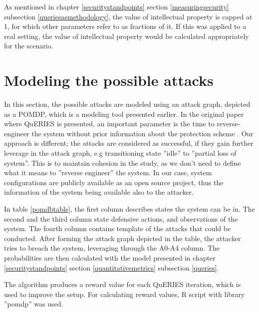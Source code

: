 As mentioned in chapter \ref{securitystandpoints} section
\ref{measuringsecurity} subsection \ref{queriesasmethodology}, the
value of intellectual property is capped at 1, for which other
parameters refer to as fractions of it. If this was applied to a real
setting, the value of intellectual property would be calculated
appropriately for the scenario.

\section{Modeling the possible attacks}

In this section, the possible attacks are modeled using an attack
graph, depicted as a POMDP, which is a modeling tool presented
earlier. In the original paper where QuERIES is presented, an
important parameter is the time to reverse-engineer the system without
prior information about the protection scheme
\cite{carin2008cybersecurity}. Our approach is different; the attacks
are considered as successful, if they gain further leverage in the
attack graph, e.g transitioning state ''idle'' to ''partial loss of
system''. This is to maintain cohesion in the study, as we don't need
to define what it means to ''reverse engineer'' the system. In our 
case, system configurations are publicly available as an open
source project, thus the information of the system being available
also to the attacker.

In table \ref{pomdbtable}, the first column describes states the
system can be in. The second and the third column state defensive
actions, and observations of the system. The fourth column contains
template of the attacks that could be conducted. After forming the
attack graph depicted in the table, the attacker tries to breach the
system, leveraging through the A0-A4 column. The probabilities are
then calculated with the model presented in chapter
\ref{securitystandpoints} section \ref{quantitativemetrics} subsection
\ref{queries}.

The algorithm produces a reward value for each QuERIES iteration,
which is used to improve the setup. For calculating reward values, R
script with library ''pomdp'' was used.

